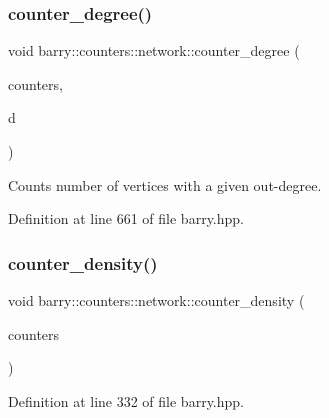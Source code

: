 \subsubsection{\texorpdfstring{counter\+\_\+degree()}{counter\_degree()}}
{\footnotesize\ttfamily void barry\+::counters\+::network\+::counter\+\_\+degree (\begin{DoxyParamCaption}\item[{\hyperlink{namespacebarry_1_1counters_1_1network_a3b3c590303d47840d1967372ae495d95}{Net\+Counter\+Vector} $\ast$}]{counters,  }\item[{std\+::vector$<$ \hyperlink{namespacebarry_a11dfc53ddb4672278319aa04f1e09a6c}{uint} $>$}]{d }\end{DoxyParamCaption})\hspace{0.3cm}{\ttfamily [inline]}}



Counts number of vertices with a given out-\/degree. 



Definition at line 661 of file barry.\+hpp.

\mbox{\label{namespacebarry_1_1counters_1_1network_a313ba439c81c589759cbbc613d12e80b}} 
\subsubsection{\texorpdfstring{counter\+\_\+density()}{counter\_density()}}
{\footnotesize\ttfamily void barry\+::counters\+::network\+::counter\+\_\+density (\begin{DoxyParamCaption}\item[{\hyperlink{namespacebarry_1_1counters_1_1network_a3b3c590303d47840d1967372ae495d95}{Net\+Counter\+Vector} $\ast$}]{counters }\end{DoxyParamCaption})\hspace{0.3cm}{\ttfamily [inline]}}



Definition at line 332 of file barry.\+hpp.

\mbox{\label{namespacebarry_1_1counters_1_1network_af8f024a17f6c518aef79c2cf670e49f5}} 
